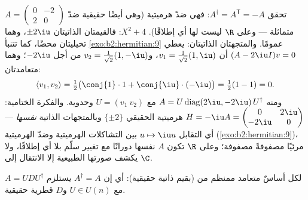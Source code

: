 \begin{example}\label{ex:b2:hermitian:skewexample}
$A = \begin{pmatrix} 0 & -2\\ 2 & 0\end{pmatrix}$ تحقق
$A^\dagger = A^{\mathsf T} = -A$: فهي ضدّ هرميتية (وهي أيضًا حقيقية
ضدّ متماثلة --- وعلى $\R$ ليست لها أي  إطلاقًا).
 $X^2 + 4$: فالقيمتان الذاتيتان $\pm2\iu$،
وهما تخيليتان محضًا، كما تتنبأ \cref{exo:b2:hermitian:9}
عمومًا. والمتجهتان الذاتيتان: يعطي $(A - 2\iu I)v = 0$ أن $v_1 =
\frac{1}{\sqrt2}(1, \iu)$، و$v_2 = \frac{1}{\sqrt2}(1,
-\iu)$ من أجل $-2\iu$؛ وهما متعامدتان:
\[
\langle v_1, v_2\rangle
= \tfrac12\bigl(\conj{1}\cdot1 +
\conj{\iu}\cdot(-\iu)\bigr)
= \tfrac12(1 - 1) = 0 .
\]
ومنه $A = U\operatorname{diag}(2\iu, -2\iu)\,U^\dagger$ مع $U =
(v_1\ v_2)$ وحدوية. والفكرة الختامية: $H = -\iu A =
\begin{pmatrix} 0 & 2\iu\\ -2\iu & 0\end{pmatrix}$ هرميتية
 الحقيقي $\{\pm2\}$ وبالمتجهات الذاتية
\emph{نفسها} --- أي التقابل $u \mapsto \iu u$ بين
التشاكلات الهرميتية وضدّ الهرميتية
(\cref{exo:b2:hermitian:9})، مرئيًا مصفوفةً مصفوفة؛ وعلى $\R$
تكون $A$ نفسها دورانًا مع تغيير سلّم بلا أي 
إطلاقًا، ولا يكشف صورتها الطبيعية إلا الانتقال إلى $\C$.
\end{example}

\begin{theorem}\label{thm:b2:hermitian:spectral}
لكل   أساسٌ متعامد ممنظم
من  (بقيم ذاتية حقيقية): أي إن $A^\dagger = A$
يستلزم $A = U D U^{\dagger}$ مع $U \in U(n)$ و$D$ قطرية
حقيقية.
\end{theorem}

